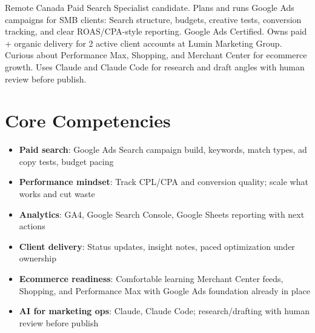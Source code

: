 \documentclass[11pt,a4paper,sans]{moderncv}
\begin{document}
\makecvtitle

\vspace{6pt}
\small{Remote Canada Paid Search Specialist candidate. Plans and runs Google Ads campaigns for SMB clients: Search structure, budgets, creative tests, conversion tracking, and clear ROAS/CPA-style reporting. Google Ads Certified. Owns paid + organic delivery for 2 active client accounts at Lumin Marketing Group. Curious about Performance Max, Shopping, and Merchant Center for ecommerce growth. Uses Claude and Claude Code for research and draft angles with human review before publish.}

\section{Core Competencies}
\vspace{1pt}
\begin{itemize}
\item \textbf{Paid search}: Google Ads Search campaign build, keywords, match types, ad copy tests, budget pacing
\item \textbf{Performance mindset}: Track CPL/CPA and conversion quality; scale what works and cut waste
\item \textbf{Analytics}: GA4, Google Search Console, Google Sheets reporting with next actions
\item \textbf{Client delivery}: Status updates, insight notes, paced optimization under ownership
\item \textbf{Ecommerce readiness}: Comfortable learning Merchant Center feeds, Shopping, and Performance Max with Google Ads foundation already in place
\item \textbf{AI for marketing ops}: Claude, Claude Code; research/drafting with human review before publish
\end{itemize}
\end{document}
